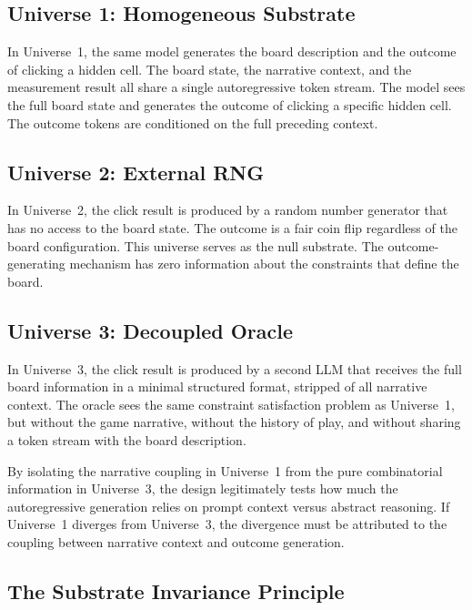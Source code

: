 \documentclass[12pt,a4paper]{article}
\begin{document}
\subsection{Universe 1: Homogeneous Substrate}
\label{sec:universe1}

In Universe~1, the same model generates the board description and the outcome of clicking a hidden cell. The board state, the narrative context, and the measurement result all share a single autoregressive token stream. The model sees the full board state and generates the outcome of clicking a specific hidden cell. The outcome tokens are conditioned on the full preceding context.

\subsection{Universe 2: External RNG}
\label{sec:universe2}

In Universe~2, the click result is produced by a random number generator that has no access to the board state. The outcome is a fair coin flip regardless of the board configuration. This universe serves as the null substrate. The outcome-generating mechanism has zero information about the constraints that define the board.

\subsection{Universe 3: Decoupled Oracle}
\label{sec:universe3}

In Universe~3, the click result is produced by a second LLM that receives the full board information in a minimal structured format, stripped of all narrative context. The oracle sees the same constraint satisfaction problem as Universe~1, but without the game narrative, without the history of play, and without sharing a token stream with the board description.

By isolating the narrative coupling in Universe~1 from the pure combinatorial information in Universe~3, the design legitimately tests how much the autoregressive generation relies on prompt context versus abstract reasoning. If Universe~1 diverges from Universe~3, the divergence must be attributed to the coupling between narrative context and outcome generation.

\subsection{The Substrate Invariance Principle}
\label{sec:invariance}
\end{document}
